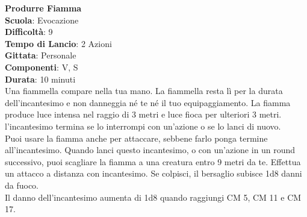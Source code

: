 \begin{multicols}{2}
\medskip\textbf{Produrre Fiamma}\\
\textbf{Scuola}: Evocazione\\
\textbf{Difficoltà}:  9\\
\textbf{Tempo di Lancio}: 2 Azioni\\
\textbf{Gittata}: Personale\\
\textbf{Componenti}: V, S\\
\textbf{Durata}: 10 minuti\\
Una fiammella compare nella tua mano. La fiammella resta lì per la durata dell'incantesimo e non danneggia né te né il tuo equipaggiamento. La fiamma produce luce intensa nel raggio di 3 metri e luce fioca per ulteriori 3 metri. l'incantesimo termina se lo interrompi con un'azione o se lo lanci di nuovo.\\
Puoi usare la fiamma anche per attaccare, sebbene farlo ponga termine all'incantesimo. Quando lanci questo incantesimo, o con un'azione in un round successivo, puoi scagliare la fiamma a una creatura entro 9 metri da te. Effettua un attacco a distanza con incantesimo. Se colpisci, il bersaglio subisce 1d8 danni da fuoco.\\
Il danno dell'incantesimo aumenta di 1d8 quando raggiungi CM 5, CM 11 e CM 17.


\end{multicols}
